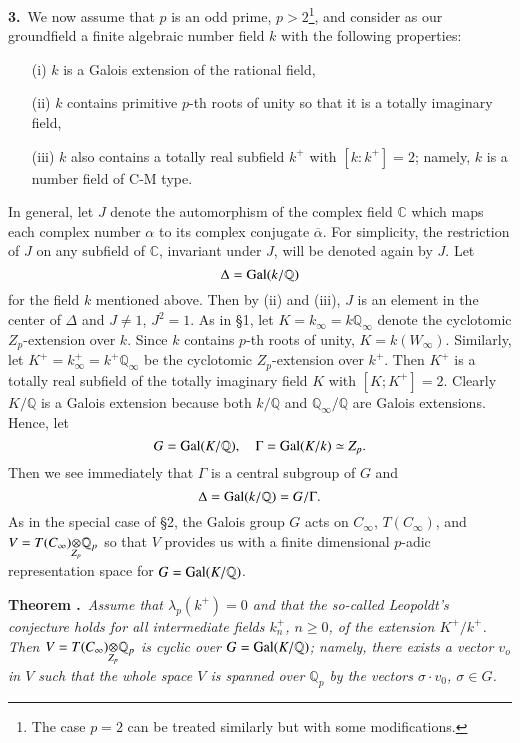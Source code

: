 \medskip
{\bf 3.}~We now assume that $p$ is an odd prime, $p>2$\footnote[5]{The case $p=2$ can be treated similarly but with some modifications.}, and consider as our ground\pageoriginale field a finite algebraic number field $k$ with the following properties:
\begin{itemize}
\item[(i)] $k$ is a Galois extension of the rational field,

\item[(ii)] $k$ contains primitive $p$-th roots of unity so that it is a totally imaginary field,

\item[(iii)] $k$ also contains a totally real subfield $k^{+}$ with $[k:k^{+}]=2$; namely, $k$ is a number field of C-M type.
\end{itemize}

In general, let $J$ denote the automorphism of the complex field $\mathbb{C}$ which maps each complex number $\alpha$ to its complex conjugate $\overline{\alpha}$. For simplicity, the restriction of $J$ on any subfield of $\mathbb{C}$, invariant under $J$, will be denoted again by $J$. Let
$$
\Delta =\operatorname{Gal}(k/\mathbb{Q})
$$
for the field $k$ mentioned above. Then by (ii) and (iii), $J$ is an element in the center of $\Delta$ and $J\neq 1$, $J^{2}=1$. As in \S1, let $K=k_{\infty}=k\mathbb{Q}_{\infty}$ denote the cyclotomic $Z_{p}$-extension over $k$. Since $k$ contains $p$-th roots of unity, $K=k(W_{\infty})$. Similarly, let $K^{+}=k^{+}_{\infty}=k^{+}\mathbb{Q}_{\infty}$ be the cyclotomic $Z_{p}$-extension over $k^{+}$. Then $K^{+}$ is a totally real subfield of the totally imaginary field $K$ with $[K;K^{+}]=2$. Clearly $K/\mathbb{Q}$ is a Galois extension because both $k/\mathbb{Q}$ and $\mathbb{Q}_{\infty}/\mathbb{Q}$ are Galois extensions. Hence, let
$$
G=\operatorname{Gal}(K/\mathbb{Q}),\quad \Gamma=\operatorname{Gal}(K/k)\simeq Z_{p}.
$$
Then we see immediately that $\Gamma$ is a central subgroup of $G$ and 
$$
\Delta=\operatorname{Gal}(k/\mathbb{Q})=G/\Gamma.
$$
As in the special case of \S2, the Galois group $G$ acts on $C_{\infty}$, $T(C_{\infty})$, and $V=\foprod{T(C_{\infty})}{\mathbb{Q}_{p}}{Z_{p}}$ so that $V$ provides us with a finite dimensional $p$-adic representation space for $G=\operatorname{Gal}(K/\mathbb{Q})$.

\medskip
\noindent
{\bf Theorem .\label{art4-thm2}}~{\em Assume that $\lambda_{p}(k^{+})=0$ and that the so-called Leopoldt's conjecture holds for all intermediate fields $k^{+}_{n}$, $n\geq 0$, of the extension $K^{+}/k^{+}$. Then $V=\foprod{T(C_{\infty})}{\mathbb{Q}_{p}}{Z_{p}}$ is cyclic over $G=\operatorname{Gal}(K/\mathbb{Q})$; namely, there exists a vector $v_{o}$ in $V$ such that the whole space $V$ is spanned over $\mathbb{Q}_{p}$ by the vectors $\sigma\cdot v_{0}$, $\sigma\in G$.}

